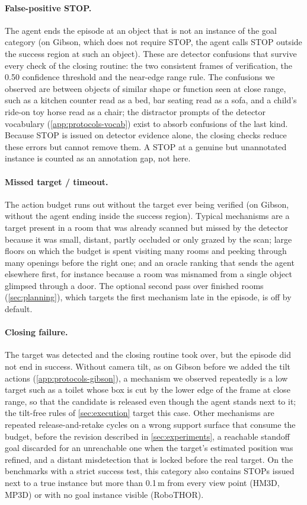 \documentclass[10pt]{article}
\begin{document}
\paragraph{False-positive STOP.} The agent ends the episode at an object that is not an instance of the goal category (on Gibson, which does not require STOP, the agent calls STOP outside the success region at such an object). These are detector confusions that survive every check of the closing routine: the two consistent frames of verification, the 0.50 confidence threshold and the near-edge range rule. The confusions we observed are between objects of similar shape or function seen at close range, such as a kitchen counter read as a bed, bar seating read as a sofa, and a child's ride-on toy horse read as a chair; the distractor prompts of the detector vocabulary (\cref{app:protocols-vocab}) exist to absorb confusions of the last kind. Because STOP is issued on detector evidence alone, the closing checks reduce these errors but cannot remove them. A STOP at a genuine but unannotated instance is counted as an annotation gap, not here.

\paragraph{Missed target / timeout.} The action budget runs out without the target ever being verified (on Gibson, without the agent ending inside the success region). Typical mechanisms are a target present in a room that was already scanned but missed by the detector because it was small, distant, partly occluded or only grazed by the scan; large floors on which the budget is spent visiting many rooms and peeking through many openings before the right one; and an oracle ranking that sends the agent elsewhere first, for instance because a room was misnamed from a single object glimpsed through a door. The optional second pass over finished rooms (\cref{sec:planning}), which targets the first mechanism late in the episode, is off by default.

\paragraph{Closing failure.} The target was detected and the closing routine took over, but the episode did not end in success. Without camera tilt, as on Gibson before we added the tilt actions (\cref{app:protocols-gibson}), a mechanism we observed repeatedly is a low target such as a toilet whose box is cut by the lower edge of the frame at close range, so that the candidate is released even though the agent stands next to it; the tilt-free rules of \cref{sec:execution} target this case. Other mechanisms are repeated release-and-retake cycles on a wrong support surface that consume the budget, before the revision described in \cref{sec:experiments}, a reachable standoff goal discarded for an unreachable one when the target's estimated position was refined, and a distant misdetection that is locked before the real target. On the benchmarks with a strict success test, this category also contains STOPs issued next to a true instance but more than 0.1\,m from every view point (HM3D, MP3D) or with no goal instance visible (RoboTHOR).
\end{document}
